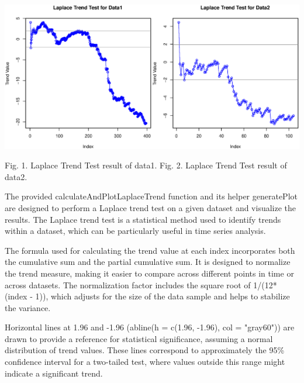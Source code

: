 \documentclass[12pt]{article}
\numberwithin{table}{section}
\begin{document}
\begin{center}
	\includegraphics[width=0.5\textwidth]{image/Data1_LaplaceTrend.eps}\includegraphics[width=0.5\textwidth]{image/Data2_LaplaceTrend.eps}
	
	{\small Fig. 1. Laplace Trend Test result of data1.}
	{\small Fig. 2. Laplace Trend Test result of data2.}
\end{center}

The provided calculateAndPlotLaplaceTrend function and its helper generatePlot are designed to perform a Laplace trend test on a given dataset and visualize the results. The Laplace trend test is a statistical method used to identify trends within a dataset, which can be particularly useful in time series analysis.

The formula used for calculating the trend value at each index incorporates both the cumulative sum and the partial cumulative sum. It is designed to normalize the trend measure, making it easier to compare across different points in time or across datasets. The normalization factor includes the square root of 1/(12*(index - 1)), which adjusts for the size of the data sample and helps to stabilize the variance.

Horizontal lines at 1.96 and -1.96 (abline(h = c(1.96, -1.96), col = "gray60")) are drawn to provide a reference for statistical significance, assuming a normal distribution of trend values. These lines correspond to approximately the 95\% confidence interval for a two-tailed test, where values outside this range might indicate a significant trend.
\end{document}

